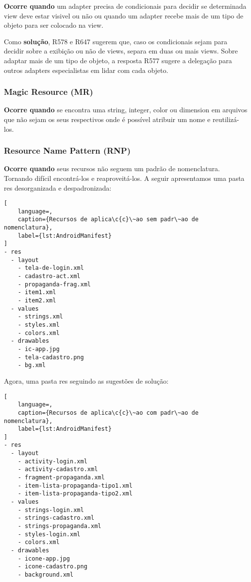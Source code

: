 \textbf{Ocorre quando} um adapter precisa de condicionais para decidir se determinada view deve estar visivel ou n\~ao ou quando um adapter recebe mais de um tipo de objeto para ser colocado na view.

Como \textbf{solu\c{c}\~ao}, R578 e R647 sugerem que, caso os condicionais sejam para decidir sobre a exibi\c{c}\~ao ou n\~ao de views, separa em duas ou mais views. Sobre adaptar mais de um tipo de objeto, a resposta R577 sugere a delega\c{c}\~ao para outros adapters especialistas em lidar com cada objeto.


\subsubsection{Magic Resource (MR)}

\textbf{Ocorre quando} se encontra uma string, integer, color ou dimension em arquivos que n\~ao sejam os seus respectivos onde \'e poss\'ivel atribuir um nome e reutiliz\'a-los. 


\subsubsection{Resource Name Pattern (RNP)}

\textbf{Ocorre quando} seus recursos n\~ao seguem um padr\~ao de nomenclatura. Tornando dif\'icil encontr\'a-los e reaproveit\'a-los. A seguir apresentamos uma pasta res desorganizada e despadronizada:

\begin{lstlisting}[
	language=, 
	caption={Recursos de aplica\c{c}\~ao sem padr\~ao de nomenclatura}, 
	label={lst:AndroidManifest}
]
- res
  - layout
    - tela-de-login.xml
    - cadastro-act.xml
    - propaganda-frag.xml
    - item1.xml
    - item2.xml
  - values
    - strings.xml 
    - styles.xml
    - colors.xml
  - drawables
    - ic-app.jpg
    - tela-cadastro.png
    - bg.xml
\end{lstlisting}

Agora, uma pasta res seguindo as sugest\~oes de solu\c{c}\~ao:

\begin{lstlisting}[
	language=, 
	caption={Recursos de aplica\c{c}\~ao com padr\~ao de nomenclatura}, 
	label={lst:AndroidManifest}
]
- res 
  - layout 
    - activity-login.xml 
    - activity-cadastro.xml 
    - fragment-propaganda.xml 
    - item-lista-propaganda-tipo1.xml 
    - item-lista-propaganda-tipo2.xml 
  - values 
    - strings-login.xml  
    - strings-cadastro.xml  
    - strings-propaganda.xml  
    - styles-login.xml 
    - colors.xml 
  - drawables 
    - icone-app.jpg 
    - icone-cadastro.png 
    - background.xml 
\end{lstlisting}

